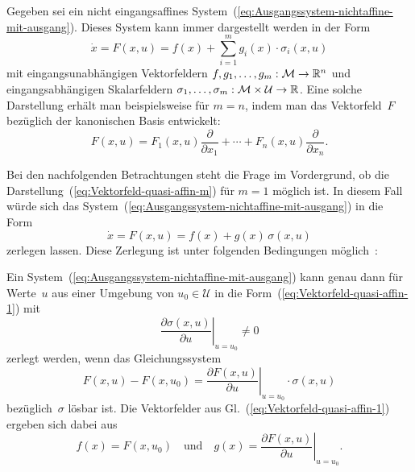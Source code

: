 Gegeben sei ein nicht eingangsaffines System~(\ref{eq:Ausgangssystem-nichtaffine-mit-ausgang}).
Dieses System kann immer dargestellt werden in der Form 
\begin{equation}
\dot{x}=F(x,u)=f(x)+\sum_{i=1}^{m}g_{i}(x)\cdot\sigma_{i}(x,u)\label{eq:Vektorfeld-quasi-affin-m}
\end{equation}
mit eingangsunabhängigen Vektorfeldern $f,g_{1},\ldots,g_{m}:\mathcal{M}\to{\mathbb{R}}^{n}$
und eingangsabhängigen Skalarfeldern $\sigma_{1},\ldots,\sigma_{m}:\mathcal{M}\times\mathcal{U}\to{\mathbb{R}}$.
Eine solche Darstellung erhält man beispielsweise für $m=n$, indem
man das Vektorfeld~$F$ bezüglich der kanonischen Basis entwickelt:
\[
F(x,u)=F_{1}(x,u)\frac{\partial}{\partial x_{1}}+\cdots+F_{n}(x,u)\frac{\partial}{\partial x_{n}}.
\]

Bei den nachfolgenden Betrachtungen steht die Frage im Vordergrund,
ob die Darstellung~(\ref{eq:Vektorfeld-quasi-affin-m}) für $m=1$
möglich ist. In diesem Fall würde sich das System~(\ref{eq:Ausgangssystem-nichtaffine-mit-ausgang})
in die Form
\begin{equation}
\dot{x}=F(x,u)=f(x)+g(x)\,\sigma(x,u)\label{eq:Vektorfeld-quasi-affin-1}
\end{equation}
zerlegen lassen. Diese Zerlegung ist unter folgenden Bedingungen möglich~\cite{gruenbacher2005}:
\begin{lemma}
\label{lem:umwandlung-nicht-affin-in-quasi-affine}Ein System~(\ref{eq:Ausgangssystem-nichtaffine-mit-ausgang})
kann genau dann für Werte~$u$ aus einer Umgebung von $u_{0}\in\mathcal{U}$
in die Form~(\ref{eq:Vektorfeld-quasi-affin-1}) mit 
\begin{equation}
\left.\frac{\partial\sigma(x,u)}{\partial u}\right|_{u=u_{0}}\neq0\label{eq:quasiaffin-SF-partielle-Abl-u}
\end{equation}
zerlegt werden, wenn das Gleichungssystem
\begin{equation}
F(x,u)-F(x,u_{0})=\left.\frac{\partial F(x,u)}{\partial u}\right|_{u=u_{0}}\cdot\sigma(x,u)\label{eq:bedingung-lin-gls-quasi-affin}
\end{equation}
bezüglich~$\sigma$ lösbar ist. Die Vektorfelder aus Gl.~(\ref{eq:Vektorfeld-quasi-affin-1})
ergeben sich dabei aus
\begin{equation}
f(x)=F(x,u_{0})\quad\text{und}\quad g(x)=\left.\frac{\partial F(x,u)}{\partial u}\right|_{u=u_{0}}.\label{eq:Vektorfelder-f-g-fuer-quasi-affin}
\end{equation}
\end{lemma}

